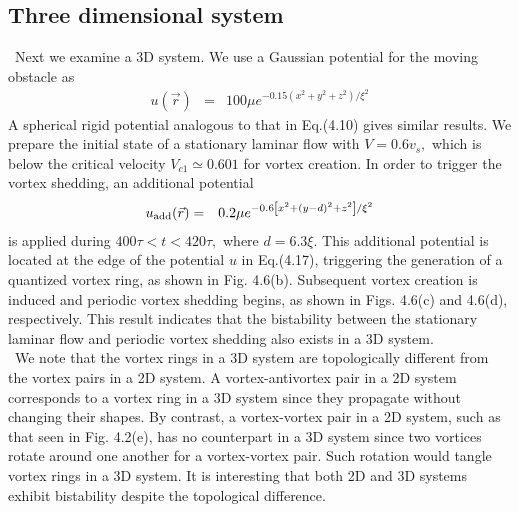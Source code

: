 \documentclass[12pt,a4paper]{report} %
\begin{document}
\subsection{Three dimensional system}
\ Next we examine a 3D system. We use a Gaussian
potential for the moving obstacle as
\begin{eqnarray}
u ( \vec{r} ) & = & 100 \mu e^{-0.15 \left(x^2+y^2+z^2 \right) / \xi^2}
\end{eqnarray}
A spherical rigid potential analogous to that in Eq.(4.10)
gives similar results. We prepare the initial state of a stationary
laminar flow with $V=0.6v_s,$ which is below the
critical velocity $V_{c1} \simeq 0.601$ for vortex creation. In order
to trigger the vortex shedding, an additional potential
\begin{eqnarray}
u_{{\rm add}} (\vec{r}) & = & 0.2\mu e^{-0.6 \left[x^2+(y-d)^2+z^2 \right] / \xi^2}
\end{eqnarray}
is applied during $400 \tau < t < 420 \tau,$ where $d=6.3 \xi$. This
additional potential is located at the edge of the potential
$u$ in Eq.(4.17), triggering the generation of a quantized
vortex ring, as shown in Fig. 4.6(b). Subsequent vortex
creation is induced and periodic vortex shedding begins,
as shown in Figs. 4.6(c) and 4.6(d), respectively. This
result indicates that the bistability between the stationary
laminar flow and periodic vortex shedding also exists in
a 3D system.
\\
\ We note that the vortex rings in a 3D system are topologically
different from the vortex pairs in a 2D system. A
vortex-antivortex pair in a 2D system corresponds to a vortex
ring in a 3D system since they propagate without changing
their shapes. By contrast, a vortex-vortex pair in a 2D system,
such as that seen in Fig. 4.2(e), has no counterpart in a 3D system
since two vortices rotate around one another for a vortex-vortex
pair. Such rotation would tangle vortex rings in a 3D system.
It is interesting that both 2D and 3D systems exhibit bistability
despite the topological difference.
\end{document}
